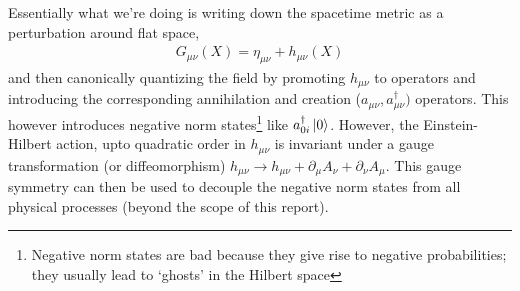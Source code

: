 \documentclass{article}
\begin{document}
Essentially what we're doing is writing down the spacetime metric as a perturbation around flat space,
\begin{align}
    G_{\mu\nu}(X)=\eta_{\mu\nu}+h_{\mu\nu}(X)
\end{align}
and then canonically quantizing the field by promoting $h_{\mu\nu}$ to operators and introducing the corresponding annihilation and creation ($a_{\mu\nu},a^\dagger_{\mu\nu})$ operators. This however introduces negative norm states\footnote{Negative norm states are bad because they give rise to negative probabilities; they usually lead to `ghosts' in the Hilbert space} like $a^\dagger_{0i}\ket{0}$. However, the Einstein-Hilbert action, upto quadratic order in $h_{\mu\nu}$ is invariant under a gauge transformation (or diffeomorphism) $h_{\mu\nu}\rightarrow h_{\mu\nu}+\partial_\mu A_\nu+\partial_\nu A_\mu$. This gauge symmetry can then be used to decouple the negative norm states from all physical processes (beyond the scope of this report).
\end{document}
